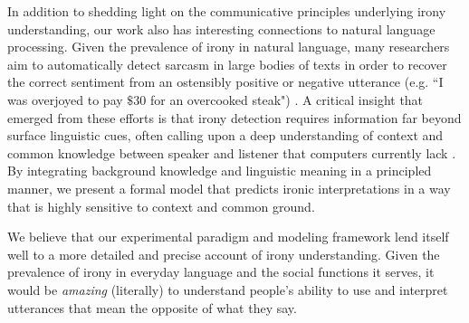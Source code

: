 \documentclass[10pt,letterpaper]{article}
\begin{document}
In addition to shedding light on the communicative principles underlying irony understanding, our work also has interesting connections to natural language processing. Given the prevalence of irony in natural language, many researchers aim to automatically detect sarcasm in large bodies of texts in order to recover the correct sentiment from an ostensibly positive or negative utterance (e.g. ``I was overjoyed to pay $\$30$ for an overcooked steak") \cite{davidov2010semi, filatova2012irony}. A critical insight that emerged from these efforts is that irony detection requires information far beyond surface linguistic cues, often calling upon a deep understanding of context and common knowledge between speaker and listener that computers currently lack \cite{gonzalez2011identifying, wallacehumans}. By integrating background knowledge and linguistic meaning in a principled manner, we present a formal model that predicts ironic interpretations in a way that is highly sensitive to context and common ground. 

We believe that our experimental paradigm and modeling framework lend itself well to a more detailed and precise account of irony understanding. Given the prevalence of irony in everyday language and the social functions it serves, it would be \emph{amazing} (literally) to understand people's ability to use and interpret utterances that mean the opposite of what they say. 

%
%



\end{document}
